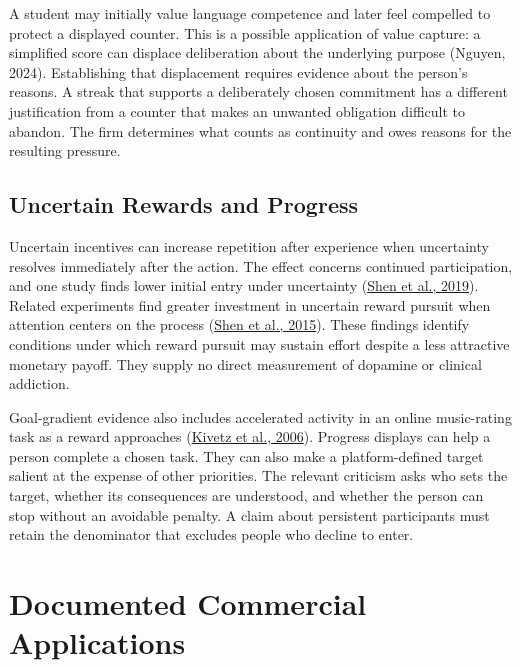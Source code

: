 A student may initially value language competence and later feel
compelled to protect a displayed counter. This is a possible application
of value capture: a simplified score can displace deliberation about the
underlying purpose (Nguyen, 2024). Establishing that displacement
requires evidence about the person's reasons. A streak that supports a
deliberately chosen commitment has a different justification from a
counter that makes an unwanted obligation difficult to abandon. The firm
determines what counts as continuity and owes reasons for the resulting
pressure.

\hypertarget{M09-uncertain-rewards-and-progress}{%
\subsection{Uncertain Rewards and
Progress}\label{M09-uncertain-rewards-and-progress}}

\noindent \noindent Uncertain incentives can increase repetition after experience
when uncertainty resolves immediately after the action. The effect
concerns continued participation, and one study finds lower initial
entry under uncertainty (\href{https://doi.org/10.1093/jcr/ucy062}{Shen
et al., 2019}). Related experiments find greater investment in uncertain
reward pursuit when attention centers on the process
(\href{https://doi.org/10.1086/679418}{Shen et al., 2015}). These
findings identify conditions under which reward pursuit may sustain
effort despite a less attractive monetary payoff. They supply no direct
measurement of dopamine or clinical addiction.

Goal-gradient evidence also includes accelerated activity in an online
music-rating task as a reward approaches
(\href{https://doi.org/10.1509/jmkr.43.1.39}{Kivetz et al., 2006}).
Progress displays can help a person complete a chosen task. They can
also make a platform-defined target salient at the expense of other
priorities. The relevant criticism asks who sets the target, whether its
consequences are understood, and whether the person can stop without an
avoidable penalty. A claim about persistent participants must retain the
denominator that excludes people who decline to enter.


\hypertarget{M09-documented-commercial-applications}{%
\section{Documented Commercial
Applications}\label{M09-documented-commercial-applications}}

